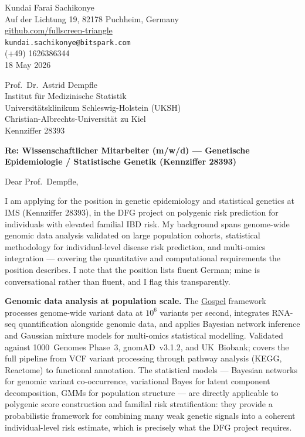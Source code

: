 \documentclass[12pt,a4paper]{article}
\begin{document}
\begin{flushright}
Kundai Farai Sachikonye \\
Auf der Lichtung 19, 82178 Puchheim, Germany \\
\href{https://github.com/fullscreen-triangle}{github.com/fullscreen-triangle} \\
\texttt{kundai.sachikonye@bitspark.com} \\
(+49) 1626386344 \\[6pt]
18 May 2026
\end{flushright}

\vspace{1em}

Prof.\ Dr.\ Astrid Dempfle \\
Institut für Medizinische Statistik \\
Universitätsklinikum Schleswig-Holstein (UKSH) \\
Christian-Albrechts-Universität zu Kiel \\
Kennziffer 28393

\vspace{1.5em}

\textbf{Re: Wissenschaftlicher Mitarbeiter (m/w/d) --- Genetische Epidemiologie /
Statistische Genetik (Kennziffer 28393)}

\vspace{1em}

Dear Prof.\ Dempfle,

I am applying for the position in genetic epidemiology and statistical genetics
at IMS (Kennziffer 28393), in the DFG project on polygenic risk prediction for
individuals with elevated familial IBD risk.
My background spans genome-wide genomic data analysis validated on large
population cohorts, statistical methodology for individual-level disease risk
prediction, and multi-omics integration --- covering the quantitative and
computational requirements the position describes.
I note that the position lists fluent German; mine is conversational rather
than fluent, and I flag this transparently.

\textbf{Genomic data analysis at population scale.}
The \href{https://github.com/fullscreen-triangle/gospel}{Gospel} framework
processes genome-wide variant data at $10^6$ variants per second, integrates
RNA-seq quantification alongside genomic data, and applies Bayesian network
inference and Gaussian mixture models for multi-omics statistical modelling.
Validated against 1000~Genomes Phase~3, gnomAD~v3.1.2, and UK~Biobank;
covers the full pipeline from VCF variant processing through pathway analysis
(KEGG, Reactome) to functional annotation.
The statistical models --- Bayesian networks for genomic variant co-occurrence,
variational Bayes for latent component decomposition, GMMs for population
structure --- are directly applicable to polygenic score construction and
familial risk stratification: they provide a probabilistic framework for
combining many weak genetic signals into a coherent individual-level risk
estimate, which is precisely what the DFG project requires.
\end{document}
